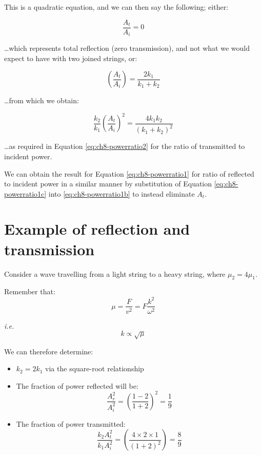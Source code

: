 \documentclass[
]{book}
\providecommand{\tightlist}{%
  \setlength{\itemsep}{0pt}\setlength{\parskip}{0pt}}
\begin{document}
This is a quadratic equation, and we can then say the following; either:

\begin{equation}
\frac{A_t}{A_i} = 0
\end{equation}

\ldots which represents total reflection (zero transmission), and not what we would expect to have with two joined strings, or:

\begin{equation}
\left(\frac{A_t}{A_i}\right) = \frac{2k_1}{k_1 + k_2}
\end{equation}

\ldots from which we obtain:

\begin{equation}
\frac{k_2}{k_1} \left(\frac{A_t}{A_i}\right)^2 = \frac{4k_1 k_2}{(k_1 + k_2)^2}
\end{equation}

\ldots as required in Equation \eqref{eq:ch8-powerratio2} for the ratio of transmitted to incident power.

We can obtain the result for Equation \eqref{eq:ch8-powerratio1} for ratio of reflected to incident power in a similar manner by substitution of Equation \eqref{eq:ch8-powerratio1c} into \eqref{eq:ch8-powerratio1b} to instead eliminate \(A_t\).

\hypertarget{sec:ch8-examplereflectiontransmission}{%
\section{Example of reflection and transmission}\label{sec:ch8-examplereflectiontransmission}}

Consider a wave travelling from a light string to a heavy string, where \(\mu_2 = 4\mu_1\).

Remember that:
\begin{equation}
\mu = \frac{F}{v^2} = F\frac{k^2}{\omega^2}
\end{equation}

\emph{i.e.}
\begin{equation}
k \propto \sqrt{\mu}
\end{equation}

We can therefore determine:

\begin{itemize}
\tightlist
\item
  \(k_2 = 2 k_1\) via the square-root relationship
\item
  The fraction of power reflected will be:
  \begin{equation}
  \frac{A_r^2}{A_i^2} = \left( \frac{1-2}{1+2}\right)^2 = \frac{1}{9}
  \end{equation}
\item
  The fraction of power transmitted:
  \begin{equation}
  \frac{k_2 A_t^2}{k_1 A_i^2} = \left( \frac{4 \times 2 \times 1}{(1+2)^2}\right) = \frac{8}{9}
  \end{equation}
\end{itemize}
\end{document}
